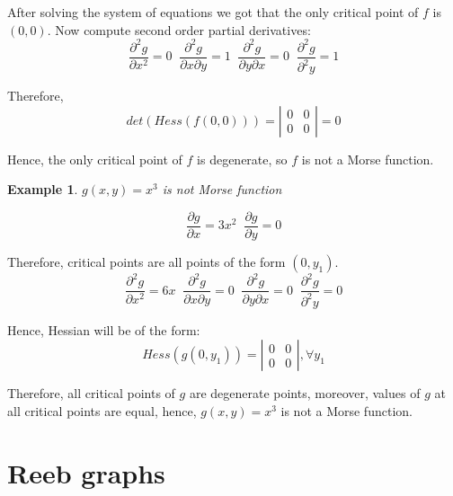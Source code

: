 \documentclass[]{article}
\newtheorem{example}{Example}
\begin{document}
After solving the system of equations we got that the only critical point of $f$ is $(0,0)$. Now compute second order partial derivatives:
\begin{equation}
\frac{\partial^2 g}{\partial x^2}=0 \;\;
\frac{\partial^2 g}{\partial x \partial y}=1 \;\;
\frac{\partial^2 g}{\partial y \partial x}=0 \;\;
\frac{\partial^2 g}{\partial^2 y}=1
\end{equation}

Therefore, 
\begin{equation}
det(Hess(f(0,0)))=\left| \begin{array}{cc} 0 & 0 \\ 0 & 0 \end{array} \right|=0   
\end{equation}

Hence, the only critical point of $f$ is degenerate, so $f$ is not a Morse function. 
\begin{example}
$g(x,y)=x^3$ is not Morse function
\end{example}
\begin{equation}
\frac{\partial g}{\partial x}=3x^2\;\;
\frac{\partial g}{\partial y}=0
\end{equation}

Therefore, critical points are all points of the form $(0, y_1)$.
\begin{equation}
\frac{\partial^2 g}{\partial x^2}=6x \;\;
\frac{\partial^2 g}{\partial x \partial y}=0 \;\;
\frac{\partial^2 g}{\partial y \partial x}=0 \;\;
\frac{\partial^2 g}{\partial^2 y}=0
\end{equation}

Hence, Hessian will be of the form:
\begin{equation}
Hess(g(0,y_1))=\left| \begin{array}{cc} 0 & 0 \\ 0 & 0 \end{array} \right|,  \forall y_1 
\end{equation}

Therefore, all critical points of $g$ are degenerate points, moreover, values of $g$ at all critical points are equal, hence, $g(x,y)=x^3$ is not a Morse function. 
\newpage
\section{Reeb graphs}
\end{document}
